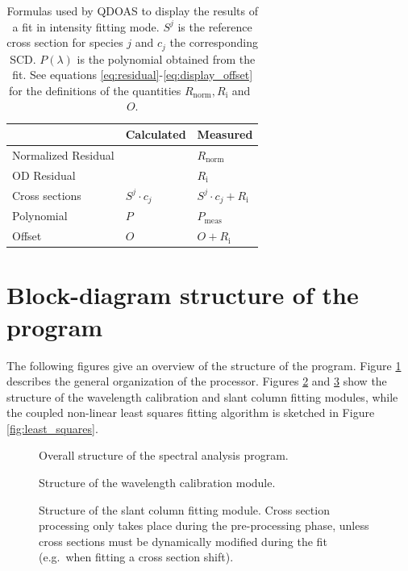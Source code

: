  \begin{table}
   \centering
   \begin{tabular}{lll} \toprule
     & Calculated & Measured\\
     \midrule
     Normalized Residual & & $R_\mathrm{norm}$  \\
     OD Residual & & $R_\mathrm{i}$\\
     Cross sections & $S^j\cdot c_j$ & $ S^j\cdot c_j + R_\mathrm{i}$ \\
     Polynomial & $P$ & $P_\mathrm{meas}$\\
     Offset & $O$ & $O + R_\mathrm{i}$ \\
    \bottomrule
   \end{tabular}
   \caption{Formulas used by QDOAS to display the results of a fit in intensity fitting mode.  $S^j$ is the reference cross section for species $j$ and $c_j$ the corresponding SCD.  $P(\lambda)$ is the polynomial obtained from the fit.  See equations \eqref{eq:residual}-\eqref{eq:display_offset} for the definitions of the quantities $R_\mathrm{norm}, R_\mathrm{i}$ and~$O$.}
   \label{tab:display_results_intensity}
 \end{table}

\section{Block-diagram structure of the program}
\label{sec:block-diagr-struct}
The following figures give an overview of the structure of the
program. Figure \ref{fig:overal_structure} describes the general
organization of the processor.  Figures
\ref{fig:wavelength_calibration} and \ref{fig:slant_column_fitting}
show the structure of the wavelength calibration and slant column
fitting modules, while the coupled non-linear least squares fitting
algorithm is sketched in Figure \ref{fig:least_squares}.

\begin{figure}
  \centerline{}
  \caption{Overall structure of the spectral analysis program.}
  \label{fig:overal_structure}
\end{figure}

\begin{figure}
  \centerline{}
  \caption{Structure of the wavelength calibration module.}
  \label{fig:wavelength_calibration}
\end{figure}

\begin{figure}
  \centerline{}
  \caption{Structure of the slant column fitting module.  Cross
    section processing only takes place during the pre-processing
    phase, unless cross sections must be dynamically modified during
    the fit (e.g.\ when fitting a cross section shift).  }
  \label{fig:slant_column_fitting}
\end{figure}

